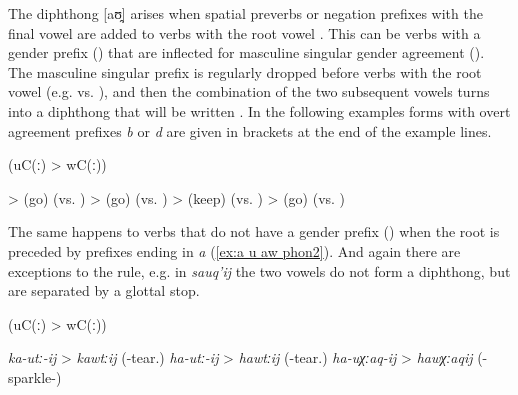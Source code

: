 The diphthong [aʊ̯] arises when spatial preverbs or negation prefixes with the final vowel  are added to verbs with the root vowel . This can be verbs with a gender prefix () that are inflected for masculine singular gender agreement (). The masculine singular prefix  is regularly dropped before verbs with the root vowel  (e.g.   vs.  ), and then the combination of the two subsequent vowels turns into a diphthong that will be written  . In the following examples forms with overt agreement prefixes \textit{b} or \textit{d} are given in brackets at the end of the example lines.
%
\begin{exe}
	 (uC(ː) > wC(ː)) \label{ex:a u aw phon}
	\begin{xlist}
		\ex	{} >   (go) (vs. ) 
		\ex	{} >   (go) (vs. )
		\ex	{} >   (keep) (vs. )
		\ex	{} >   (go) (vs. )
	\end{xlist}
\end{exe}

The same happens to verbs that do not have a gender prefix () when the root is preceded by prefixes ending in \textit{a} (\ref{ex:a u aw phon2}). And again there are exceptions to the rule, e.g. in \textit{sauq'ij}  the two vowels do not form a diphthong, but are separated by a glottal stop.
%
\begin{exe}
	 (uC(ː) > wC(ː)) \label{ex:a u aw phon2}
	\begin{xlist}
		\ex	\textit{ka-utː-ij} > \textit{kawtːij}  (-tear.\tsc{ipfv-inf})
		\ex \textit{ha-utː-ij} > \textit{hawtːij}  (-tear.\tsc{ipfv-inf})
		\ex \textit{ha-uχːaq-ij} > \textit{hawχːaqij}  (-sparkle-\tsc{caus-inf})
	\end{xlist}
\end{exe}

